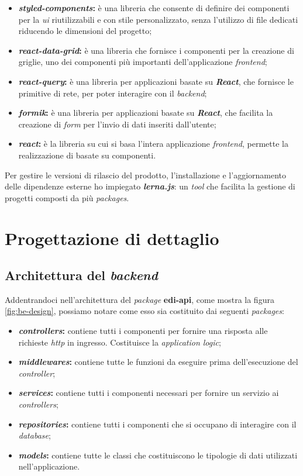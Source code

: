 \begin{itemize}
\begin{itemize}
      \item \textbf{\emph{styled-components}:} è una libreria che consente di definire dei componenti per la \emph{\gls{ui}} riutilizzabili e con stile personalizzato, senza l'utilizzo di file dedicati riducendo le dimensioni del progetto;
      \item \textbf{\emph{react-data-grid}:} è una libreria che fornisce i componenti per la creazione di griglie, uno dei componenti più importanti dell'applicazione \emph{\gls{frontend}};
      \item \textbf{\emph{react-query}:} è una libreria per applicazioni basate su \emph{\textbf{React}}, che fornisce le primitive di rete, per poter interagire con il \emph{\gls{backend}};
      \item \textbf{\emph{formik}:} è una libreria per applicazioni basate su \emph{\textbf{React}}, che facilita la creazione di \emph{form} per l'invio di dati inseriti dall'utente;
      \item \textbf{\emph{react}:} è la libreria su cui si basa l'intera applicazione \emph{\gls{frontend}}, permette la realizzazione di \emph{} basate su componenti.
    \end{itemize}
\end{itemize} 

Per gestire le versioni di rilascio del prodotto, l'installazione e l'aggiornamento delle dipendenze esterne ho impiegato \emph{\textbf{lerna.js}}: un \emph{tool} che facilita la gestione di progetti composti da più \emph{packages}.

\section{Progettazione di dettaglio}

\subsection{Architettura del \emph{\gls{backend}}}
Addentrandoci nell'architettura del \emph{package} \textbf{edi-api}, come mostra la figura \ref{fig:be-design}, possiamo notare come esso sia costituito dai seguenti \emph{packages}:
\begin{itemize}
  \item \textbf{\emph{controllers}:} contiene tutti i componenti per fornire una risposta alle richieste \emph{\acrshort{http}} in ingresso. Costituisce la \emph{application logic};
  \item \textbf{\emph{middlewares}:} contiene tutte le funzioni da eseguire prima dell'esecuzione del \emph{controller};
  \item \textbf{\emph{services}:} contiene tutti i componenti necessari per fornire un servizio ai \emph{controllers};
  \item \textbf{\emph{repositories}:} contiene tutti i componenti che si occupano di interagire con il \emph{database};
  \item \textbf{\emph{models}:} contiene tutte le classi che costituiscono le tipologie di dati utilizzati nell'applicazione.
\end{itemize}

